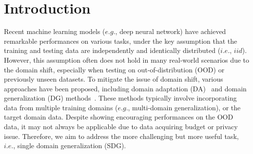\section{Introduction}


Recent machine learning models ($e.g.$, deep neural network) have achieved remarkable performances on various tasks, under the key assumption that the training and testing data are independently and identically distributed ($i.e.$, $iid$). However, this assumption often does not hold in many real-world scenarios due to the domain shift, especially when testing on out-of-distribution (OOD) or previously unseen datasets. To mitigate the issue of domain shift, various approaches have been proposed, including domain adaptation (DA)~\cite{ganin2016domain, long2013transfer, pan2019transferrable, qu2022bmd, qu2023upcycling, cheng2023efficient} and domain generalization (DG) methods~\cite{IKI, StPR, wang2022generalizing, zhang2022towards, cheng2024disentangled, PADG, RD-MLDG}. These methods typically involve incorporating data from multiple training domains ($e.g.$, multi-domain generalization), or the target domain data. Despite showing encouraging performances on the OOD data, it may not always be applicable due to data acquiring budget or privacy issue. Therefore, we aim to address the more challenging but more useful task, $i.e.$, single domain generalization (SDG).




